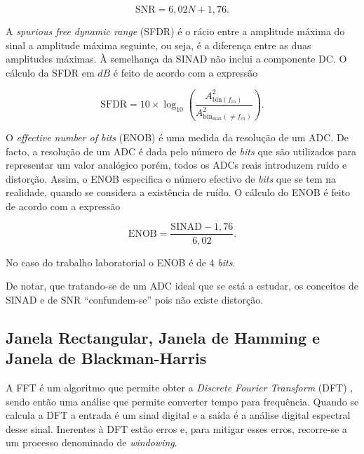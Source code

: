 \documentclass[11pt]{article}
\numberwithin{equation}{section}
\begin{document}
\vspace{-3mm}
\begin{equation}
\text{SNR} = 6,02N + 1,76.
\label{eq:SNR}
\end{equation}

\vspace{1mm}
A \textit{spurious free dynamic range} (SFDR) é o rácio entre a amplitude máxima do sinal a amplitude máxima seguinte, ou seja, é a diferença entre as duas amplitudes máximas. À semelhança da SINAD não inclui a componente DC. O cálculo da SFDR em $dB$ é feito de acordo com a expressão

\vspace{-3mm}
\begin{equation}
\text{SFDR} = 10\times \log_{10} \left(\frac{A^{2}_{\text{bin}(f_{in})}}{A^{2}_{\text{bin}_{\text{max}}(\neq f_{in})}}\right).
\label{eq:SFDR}
\end{equation}

\vspace{1mm}
O \textit{effective number of bits} (ENOB) é uma medida da resolução de um ADC. De facto, a resolução de um ADC é dada pelo número de \textit{bits} que são utilizados para representar um valor analógico porém, todos os ADCs reais introduzem ruído e distorção. Assim, o ENOB especifica o número efectivo de \textit{bits} que se tem na realidade, quando se considera a existência de ruído. O cálculo do ENOB é feito de acordo com a expressão

\vspace{-3mm}
\begin{equation}
\text{ENOB} = \frac{\text{SINAD}-1,76}{6,02}.
\label{eq:ENOB}
\end{equation}

\vspace{1mm}
No caso do trabalho laboratorial o ENOB é de 4 \textit{bits}.

De notar, que tratando-se de um ADC ideal que se está a estudar, os conceitos de SINAD e de SNR ``confundem-se'' pois não existe distorção.

\subsection{Janela Rectangular, Janela de Hamming e Janela de Blackman-Harris}

A FFT é um algoritmo que permite obter a \textit{Discrete Fourier Transform} (DFT) , sendo então uma análise que permite converter tempo para frequência. Quando se calcula a DFT a entrada é um sinal digital e a saída é a análise digital espectral desse sinal. Inerentes à DFT estão erros e, para mitigar esses erros, recorre-se a um processo denominado de \textit{windowing}.
\end{document}
